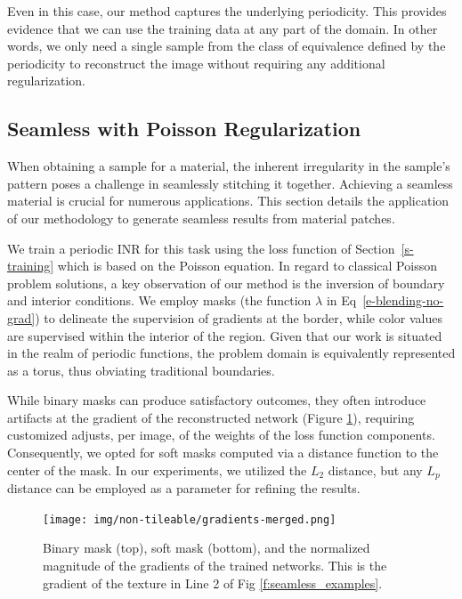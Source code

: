 Even in this case, our method captures the underlying periodicity. This provides evidence that we can use the training data at any part of the domain. In other words, we only need a single sample from the class of equivalence defined by the periodicity to reconstruct the image without requiring any additional regularization.

\subsection{Seamless with Poisson Regularization}\label{s:poisson-regularization}

When obtaining a sample for a material, the inherent irregularity in the sample's pattern poses a challenge in seamlessly stitching it together. Achieving a seamless material is crucial for numerous applications. This section details the application of our methodology to generate seamless results from material patches.

We train a periodic INR for this task using the loss function of Section~\ref{s-training} which is based on the Poisson equation. In regard to classical Poisson problem solutions, a key observation of our method is the inversion of boundary and interior conditions. 
We employ masks (the function $\lambda$ in Eq~\ref{e-blending-no-grad}) to delineate the supervision of gradients at the border, while color values are supervised within the interior of the region. Given that our work is situated in the realm of periodic functions, the problem domain is equivalently represented as a torus, thus obviating traditional boundaries.


While binary masks can produce satisfactory outcomes, they often introduce artifacts at the gradient of the reconstructed network (Figure \ref{f:training_masks}), requiring customized adjusts, per image, of the weights of the loss function components. Consequently, we opted for soft masks computed via a distance function to the center of the mask. 
In our experiments, we utilized the $L_2$ distance, but any $L_p$ distance can be employed as a parameter for refining the results. 
\begin{figure}[!h]
\centering
\texttt{[image: img/non-tileable/gradients-merged.png]}

\vspace{-0.4cm}
\caption{Binary mask (top), soft mask (bottom), and the normalized magnitude of the gradients of the trained networks. This is the gradient of the texture in Line 2 of Fig \ref{f:seamless_examples}.}
\label{f:training_masks}
\end{figure}

